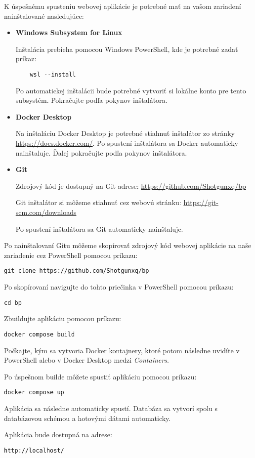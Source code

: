 K úspešnému spusteniu webovej aplikácie je potrebné mať na vašom zariadení nainštalované nasledujúce:

\begin{itemize}
    \item \textbf{Windows Subsystem for Linux}

    Inštalácia prebieha pomocou Windows PowerShell, kde je potrebné zadať príkaz:
    \begin{verbatim}
    wsl --install
    \end{verbatim}
    Po automatickej inštalácii bude potrebné vytvoriť si lokálne konto pre tento subsystém. Pokračujte podľa pokynov inštalátora.

    \item \textbf{Docker Desktop}

    Na inštaláciu Docker Desktop je potrebné stiahnuť inštalátor zo stránky \url{https://docs.docker.com/}. Po spustení inštalátora sa Docker automaticky nainštaluje. Ďalej pokračujte podľa pokynov inštalátora.

    \item \textbf{Git}

    Zdrojový kód je dostupný na Git adrese: \url{https://github.com/Shotgunxq/bp}

    Git inštalátor si môžeme stiahnuť cez webovú stránku: \url{https://git-scm.com/downloads}

    Po spustení inštalátora sa Git automaticky nainštaluje.
\end{itemize}

Po nainštalovaní Gitu môžeme skopírovať zdrojový kód webovej aplikácie na naše zariadenie cez PowerShell pomocou príkazu:
\begin{verbatim}
git clone https://github.com/Shotgunxq/bp
\end{verbatim}

Po skopírovaní navigujte do tohto priečinka v PowerShell pomocou príkazu:
\begin{verbatim}
cd bp
\end{verbatim}

Zbuildujte aplikáciu pomocou príkazu:
\begin{verbatim}
docker compose build
\end{verbatim}
Počkajte, kým sa vytvoria Docker kontajnery, ktoré potom následne uvidíte v PowerShell alebo v Docker Desktop medzi \textit{Containers}.

Po úspešnom builde môžete spustiť aplikáciu pomocou príkazu:
\begin{verbatim}
docker compose up
\end{verbatim}

Aplikácia sa následne automaticky spustí. Databáza sa vytvorí spolu s databázovou schémou a hotovými dátami automaticky.

Aplikácia bude dostupná na adrese:
\begin{verbatim}
http://localhost/
\end{verbatim}